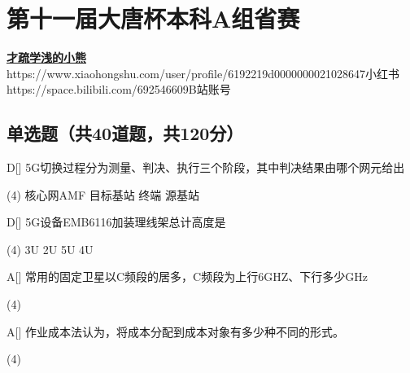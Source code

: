 \chapter{第十一届大唐杯本科A组省赛}
\fancyhead[R]{\color{H6}\kaishu\rightmark\,}

\date{2024年4月20日}{}{\href{https://github.com/xubenshan/dtcup}{\textbf{才疏学浅的小熊}}}
{}
{https://www.xiaohongshu.com/user/profile/6192219d0000000021028647}{小红书}
{https://space.bilibili.com/692546609}{B站账号}



\section{单选题（共40道题，共120分）}



\begin{choice}{D}[]
    5G切换过程分为测量、判决、执行三个阶段，其中判决结果由哪个网元给出
    \begin{tasks}(4)
        \task 核心网AMF
        \task 目标基站
        \task 终端
        \task 源基站
    \end{tasks}
\end{choice}


\begin{choice}{D}[]
    5G设备EMB6116加装理线架总计高度是
    \begin{tasks}(4)
        \task 3U
        \task 2U
        \task 5U
        \task 4U
    \end{tasks}
\end{choice}




\begin{choice}{A}[]
    常用的固定卫星以C频段的居多，C频段为上行6GHZ、下行多少GHz
    \begin{tasks}(4)
    \end{tasks}
\end{choice}




\begin{choice}{A}[]
    作业成本法认为，将成本分配到成本对象有多少种不同的形式。
    \begin{tasks}(4)
    \end{tasks}
\end{choice}


